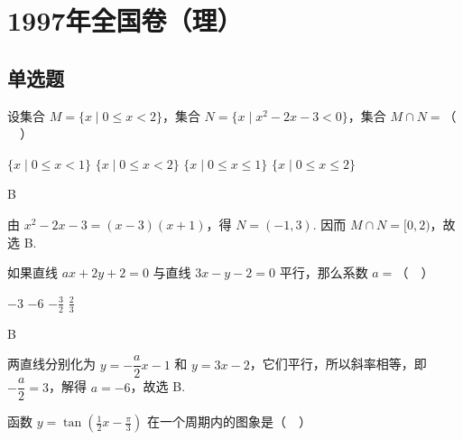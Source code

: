 \documentclass[UTF8,a4paper,oneside,11pt]{ctexbook}
\begin{document}
\mainmatter

\chapter{1997年全国卷（理）}
\section{单选题}

\begin{problem}
设集合 \(M = \{x \mid 0 \leqslant x < 2\}\)，集合 \(N = \{x \mid x^2 - 2x - 3 < 0\}\)，集合 \(M \cap N =\)（\(\quad\)）

\choices
    {\(\{x \mid 0\leqslant x < 1\}\)}
    {\(\{x \mid 0\leqslant x < 2\}\)}
    {\(\{x \mid 0\leqslant x\leqslant 1\}\)}
    {\(\{x \mid 0\leqslant x\leqslant 2\}\)}
\end{problem}

\begin{answer}
B
\end{answer}

\begin{solution}
由 \(x^{2}-2x-3=(x-3)(x+1)\)，得 \(N=(-1,3)\). 因而 \(M\cap N=[0,2)\)，故选 B.
\end{solution}

\begin{problem}
如果直线 \(ax + 2y + 2 = 0\) 与直线 \(3x - y - 2 = 0\) 平行，那么系数 \(a =\)（\(\quad\)）

\choices
    {\(-3\)}
    {\(-6\)}
    {\(-\frac{3}{2}\)}
    {\(\frac{2}{3}\)}
\end{problem}

\begin{answer}
B
\end{answer}

\begin{solution}
两直线分别化为 \(y=-\dfrac{a}{2}x-1\) 和 \(y=3x-2\)，它们平行，所以斜率相等，即 \(-\dfrac{a}{2}=3\)，解得 \(a=-6\)，故选 B.
\end{solution}

\begin{problem}
函数 \(y = \tan \left(\frac{1}{2}x - \frac{\pi}{3}\right)\) 在一个周期内的图象是（\(\quad\)）

\choices
    {}
    {}
    {}
    {}
\end{problem}
\end{document}

